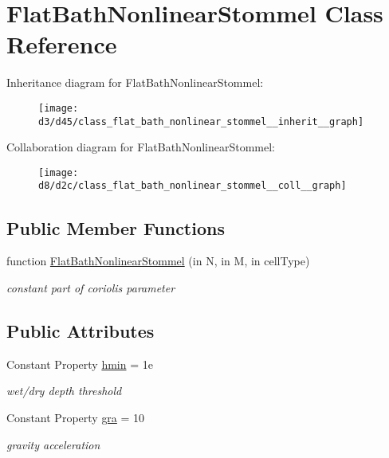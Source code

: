 \hypertarget{class_flat_bath_nonlinear_stommel}{}\section{Flat\+Bath\+Nonlinear\+Stommel Class Reference}
\label{class_flat_bath_nonlinear_stommel}


Inheritance diagram for Flat\+Bath\+Nonlinear\+Stommel\+:
\nopagebreak
\begin{figure}[H]
\begin{center}
\leavevmode
\texttt{[image: d3/d45/class\_flat\_bath\_nonlinear\_stommel\_\_inherit\_\_graph]}
\end{center}
\end{figure}


Collaboration diagram for Flat\+Bath\+Nonlinear\+Stommel\+:
\nopagebreak
\begin{figure}[H]
\begin{center}
\leavevmode
\texttt{[image: d8/d2c/class\_flat\_bath\_nonlinear\_stommel\_\_coll\_\_graph]}
\end{center}
\end{figure}
\subsection*{Public Member Functions}
\begin{DoxyCompactItemize}
\item 
function \hyperlink{class_flat_bath_nonlinear_stommel_ab56cb7c40e0f747a1f76d2a67c8ebc6c}{Flat\+Bath\+Nonlinear\+Stommel} (in N, in M, in cell\+Type)
\begin{DoxyCompactList}\small\item\em constant part of coriolis parameter \end{DoxyCompactList}\end{DoxyCompactItemize}
\subsection*{Public Attributes}
\begin{DoxyCompactItemize}
\item 
Constant Property \hyperlink{class_flat_bath_nonlinear_stommel_a602de7927f85524c6a520e2d58d43e0e}{hmin} = 1e
\begin{DoxyCompactList}\small\item\em wet/dry depth threshold \end{DoxyCompactList}\item 
Constant Property \hyperlink{class_flat_bath_nonlinear_stommel_a47b76d31b14d233351912771789c7de6}{gra} = 10
\begin{DoxyCompactList}\small\item\em gravity acceleration \end{DoxyCompactList}\end{DoxyCompactItemize}
